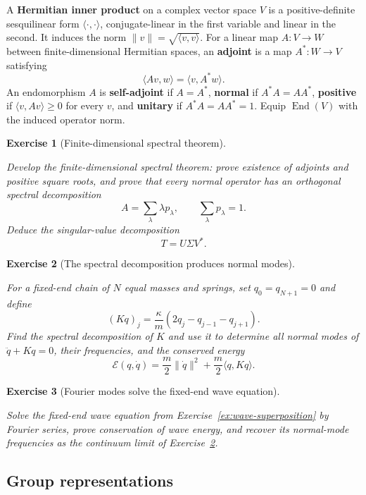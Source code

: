 \documentclass{article}
\newtheorem{exercise}{Exercise}
\newcommand{\End}{\operatorname{End}}
\begin{document}
A \textbf{Hermitian inner product} on a complex vector space $V$ is a positive-definite sesquilinear form $\langle\mathord{\cdot},\mathord{\cdot}\rangle$, conjugate-linear in the first variable and linear in the second. It induces the norm $\|v\|=\sqrt{\langle v,v\rangle}$. For a linear map $A:V\to W$ between finite-dimensional Hermitian spaces, an \textbf{adjoint} is a map $A^*:W\to V$ satisfying
\[
\langle Av,w\rangle=\langle v,A^*w\rangle.
\]
An endomorphism $A$ is \textbf{self-adjoint} if $A=A^*$, \textbf{normal} if $A^*A=AA^*$, \textbf{positive} if $\langle v,Av\rangle\geq0$ for every $v$, and \textbf{unitary} if $A^*A=AA^*=1$. Equip $\End(V)$ with the induced operator norm.

\begin{exercise}[Finite-dimensional spectral theorem]\label{ex:finite-spectral-theorem}\leavevmode\par
\textit{Develop the finite-dimensional spectral theorem: prove existence of
adjoints and positive square roots, and prove that every normal operator has
an orthogonal spectral decomposition}
\[
A=\sum_\lambda\lambda p_\lambda,
\qquad \sum_\lambda p_\lambda=1.
\]
\textit{Deduce the singular-value decomposition}
\[
T=U\Sigma V^*.
\]
\end{exercise}

\begin{exercise}[The spectral decomposition produces normal modes]
\label{ex:vibrating-chain}\leavevmode\par
\textit{For a fixed-end chain of $N$ equal masses and springs, set
$q_0=q_{N+1}=0$ and define}
\[
(Kq)_j=\frac{\kappa}{m}(2q_j-q_{j-1}-q_{j+1}).
\]
\textit{Find the spectral decomposition of $K$ and use it to determine all
normal modes of $\ddot q+Kq=0$, their frequencies, and the conserved energy}
\[
\mathcal E(q,\dot q)
=\frac m2\|\dot q\|^2+\frac m2\langle q,Kq\rangle.
\]
\end{exercise}

\begin{exercise}[Fourier modes solve the fixed-end wave equation]
\label{ex:fixed-end-wave}\leavevmode\par
\textit{Solve the fixed-end wave equation from
Exercise~\ref{ex:wave-superposition} by Fourier series, prove conservation
of wave energy, and recover its normal-mode frequencies as the continuum
limit of Exercise~\ref{ex:vibrating-chain}.}
\end{exercise}

\subsection{Group representations}
\end{document}
